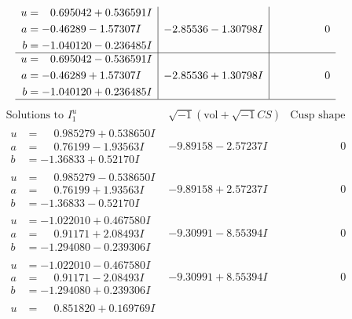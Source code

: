 \documentclass[1p]{elsarticle_modified}
\theoremstyle{definition}
\newcommand{\I}{\sqrt{-1}}
\begin{document}
$$\begin{array}{c|c|c}
\begin{aligned}
u &= \phantom{-}0.695042 + 0.536591 I \\
a &= -0.46289 - 1.57307 I \\
b &= -1.040120 - 0.236485 I\end{aligned}
 & -2.85536 - 1.30798 I & \phantom{-0.000000 } 0 \\ \hline\begin{aligned}
u &= \phantom{-}0.695042 - 0.536591 I \\
a &= -0.46289 + 1.57307 I \\
b &= -1.040120 + 0.236485 I\end{aligned}
 & -2.85536 + 1.30798 I & \phantom{-0.000000 } 0\\
 \hline 
 \end{array}$$\newpage$$\begin{array}{c|c|c}  
\text{Solutions to }I^u_{1}& \I (\text{vol} + \sqrt{-1}CS) & \text{Cusp shape}\\
 \hline 
\begin{aligned}
u &= \phantom{-}0.985279 + 0.538650 I \\
a &= \phantom{-}0.76199 - 1.93563 I \\
b &= -1.36833 + 0.52170 I\end{aligned}
 & -9.89158 - 2.57237 I & \phantom{-0.000000 } 0 \\ \hline\begin{aligned}
u &= \phantom{-}0.985279 - 0.538650 I \\
a &= \phantom{-}0.76199 + 1.93563 I \\
b &= -1.36833 - 0.52170 I\end{aligned}
 & -9.89158 + 2.57237 I & \phantom{-0.000000 } 0 \\ \hline\begin{aligned}
u &= -1.022010 + 0.467580 I \\
a &= \phantom{-}0.91171 + 2.08493 I \\
b &= -1.294080 - 0.239306 I\end{aligned}
 & -9.30991 - 8.55394 I & \phantom{-0.000000 } 0 \\ \hline\begin{aligned}
u &= -1.022010 - 0.467580 I \\
a &= \phantom{-}0.91171 - 2.08493 I \\
b &= -1.294080 + 0.239306 I\end{aligned}
 & -9.30991 + 8.55394 I & \phantom{-0.000000 } 0 \\ \hline\begin{aligned}
u &= \phantom{-}0.851820 + 0.169769 I \\

\end{aligned}
\end{array}$$
\end{document}
